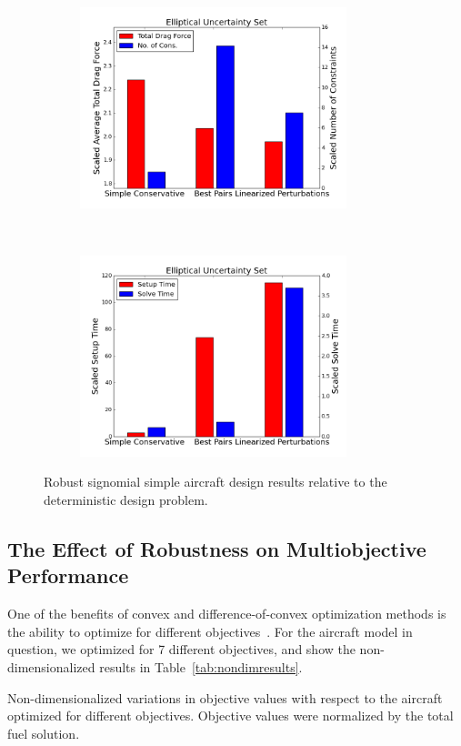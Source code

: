 \begin{figure}[ht]
\begin{subfigure}{0.499\textwidth}
        \includegraphics[height=2.3in]{signomial_simple_flight/ell.png}
    \end{subfigure}%
    ~ 
    \begin{subfigure}{0.49\textwidth}
        \centering
        \includegraphics[height=2.3in]{signomial_simple_flight/ell_times.png}
    \end{subfigure}
    \caption{Robust signomial simple aircraft design results relative to the deterministic design problem.}
    \label{compare_signomial}
\end{figure}

\subsection{The Effect of Robustness on Multiobjective Performance}

One of the benefits of convex and difference-of-convex optimization methods is the ability to optimize for
different objectives~\cite{York2018}. For the aircraft model in question, we optimized for 7 different objectives, and show
the non-dimensionalized results in Table~\ref{tab:nondimresults}.

\begin{table}
\caption{Non-dimensionalized variations in objective values with respect to the aircraft optimized
for different objectives. Objective values were normalized by the total fuel solution.}
    \label{tab:nondimresults}
\end{table}

